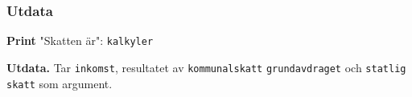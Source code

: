 \documentclass[../main.tex]{subfiles}
\begin{document}
\subsubsection{Utdata}

\begin{algorithm}[H]
\SetAlgoLined

\textbf{Print} "Skatten är": \texttt{kalkyler}
 
 \caption{\textbf{Utdata.} Tar \texttt{inkomst}, resultatet av \texttt{kommunalskatt} \texttt{grundavdraget} och  \texttt{statlig skatt} som argument.}
 
\end{algorithm}
\end{document}

